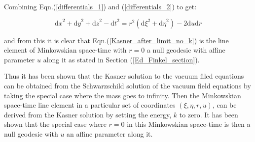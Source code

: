 \noindent Combining Eqn.(\ref{differentials_1}) and (\ref{differentials_2}) to get:

\begin{equation*}
{\mathrm{d}x}^2 + {\mathrm{d}y}^2 + {\mathrm{d}z}^2 - {\mathrm{d}t}^2 = r^2 ({\mathrm{d}\xi}^2 + {\mathrm{d}\eta}^2) - 2 {\mathrm{d}u}{\mathrm{d}r}
\end{equation*}

\noindent and from this it is clear that Eqn.(\ref{Kasner_after_limit_no_k}) is the line element of Minkowskian space-time with $r = 0$ a null geodesic with affine parameter $u$ along it as stated in Section (\ref{Ed_Finkel_section}).

Thus it has been shown that the Kasner solution to the vacuum filed equations can be obtained from the Schwarzschild solution of the vacuum field equations by taking the special case where the mass goes to infinity. Then the Minkowskian space-time line element in a particular set of coordinates $(\xi, \eta, r, u)$, can be derived from the Kasner solution by setting the energy, $k$ to zero. It has been shown that the special case where $r=0$ in this Minkowskian space-time is then a null geodesic with $u$ an affine parameter along it.  
